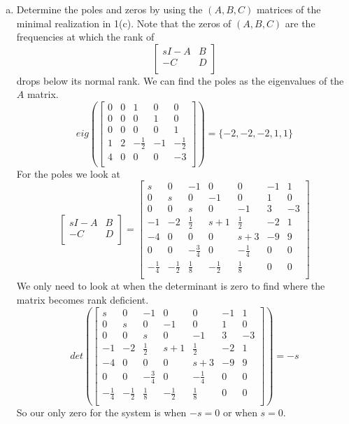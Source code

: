 \documentclass{article}
\begin{document}
\begin{enumerate}[(a)]
\item Determine the poles and zeros by using the $(A,B,C)$ matrices of the minimal realization in 1(c).
\newline
Note that the zeros of $(A,B,C)$ are the frequencies at which the rank of
$$
\begin{bmatrix}
sI-A & B \\
-C & D \\
\end{bmatrix}
$$
drops below its normal rank.
\newline
\newline
We can find the poles as the eigenvalues of the $A$ matrix.
$$
eig\left(
\begin{bmatrix}
0 & 0 & 1 & 0 & 0 \\
0 & 0 & 0 & 1 & 0 \\
0 & 0 & 0 & 0 & 1 \\
1 & 2 & -\frac{1}{2} & -1 & -\frac{1}{2} \\
4 & 0 & 0 & 0 & -3 \\
\end{bmatrix}
\right)
=
\{-2, -2, -2, 1, 1\}
$$
For the poles we look at
$$
\begin{bmatrix}
sI-A & B \\
-C & D \\
\end{bmatrix}
=
\begin{bmatrix}
s & 0 & -1 & 0 & 0 & -1 & 1 \\
0 & s & 0 & -1 & 0 & 1 & 0 \\
0 & 0 & s & 0 & -1 & 3 & -3 \\
-1 & -2 & \frac{1}{2} & s+1 & \frac{1}{2} & -2 & 1 \\
-4 & 0 & 0 & 0 & s+3 & -9 & 9 \\
0 & 0 & -\frac{3}{4} & 0 & -\frac{1}{4} & 0 & 0 \\
-\frac{1}{4} & -\frac{1}{2} & \frac{1}{8} & -\frac{1}{2} & \frac{1}{8} & 0 & 0 \\
\end{bmatrix}
$$
We only need to look at when the determinant is zero to find where the matrix becomes rank deficient.
$$
det\left(
\begin{bmatrix}
s & 0 & -1 & 0 & 0 & -1 & 1 \\
0 & s & 0 & -1 & 0 & 1 & 0 \\
0 & 0 & s & 0 & -1 & 3 & -3 \\
-1 & -2 & \frac{1}{2} & s+1 & \frac{1}{2} & -2 & 1 \\
-4 & 0 & 0 & 0 & s+3 & -9 & 9 \\
0 & 0 & -\frac{3}{4} & 0 & -\frac{1}{4} & 0 & 0 \\
-\frac{1}{4} & -\frac{1}{2} & \frac{1}{8} & -\frac{1}{2} & \frac{1}{8} & 0 & 0 \\
\end{bmatrix}
\right)
=
-s
$$
So our only zero for the system is when $-s = 0$ or when $s=0$.
\newline
{}

\end{enumerate}
\end{document}
